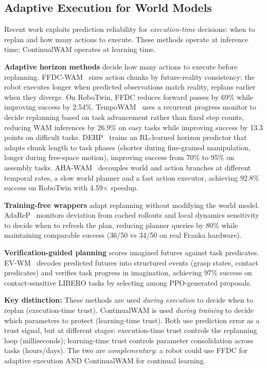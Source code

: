 \documentclass{article}
\begin{document}
\subsection{Adaptive Execution for World Models}

Recent work exploits prediction reliability for \emph{execution-time} decisions: when to replan and how many actions to execute. These methods operate at inference time; ContinualWAM operates at learning time.

\textbf{Adaptive horizon methods} decide how many actions to execute before replanning. FFDC-WAM~\cite{when2trust2026} sizes action chunks by future-reality consistency: the robot executes longer when predicted observations match reality, replans earlier when they diverge. On RoboTwin, FFDC reduces forward passes by 69\% while improving success by 2.54\%. TempoWAM~\cite{tempowam2026} uses a recurrent progress monitor to decide replanning based on task advancement rather than fixed step counts, reducing WAM inferences by 26.9\% on easy tasks while improving success by 13.3 points on difficult tasks. DEHP~\cite{dehp2026} trains an RL-learned horizon predictor that adapts chunk length to task phases (shorter during fine-grained manipulation, longer during free-space motion), improving success from 70\% to 95\% on assembly tasks. AHA-WAM~\cite{ahawam2026} decouples world and action branches at different temporal rates, a slow world planner and a fast action executor, achieving 92.8\% success on RoboTwin with 4.59$\times$ speedup.

\textbf{Training-free wrappers} adapt replanning without modifying the world model. AdaReP~\cite{adarep2026} monitors deviation from cached rollouts and local dynamics sensitivity to decide when to refresh the plan, reducing planner queries by 80\% while maintaining comparable success (36/50 vs 34/50 on real Franka hardware).

\textbf{Verification-guided planning} scores imagined futures against task predicates. EV-WM~\cite{evwm2026} decodes predicted futures into structured events (grasp states, contact predicates) and verifies task progress in imagination, achieving 97\% success on contact-sensitive LIBERO tasks by selecting among PPO-generated proposals.

\textbf{Key distinction:} These methods are used \emph{during execution} to decide when to replan (execution-time trust). ContinualWAM is used \emph{during training} to decide which parameters to protect (learning-time trust). Both use prediction error as a trust signal, but at different stages: execution-time trust controls the replanning loop (milliseconds); learning-time trust controls parameter consolidation across tasks (hours/days). The two are \emph{complementary}: a robot could use FFDC for adaptive execution AND ContinualWAM for continual learning.
\end{document}
